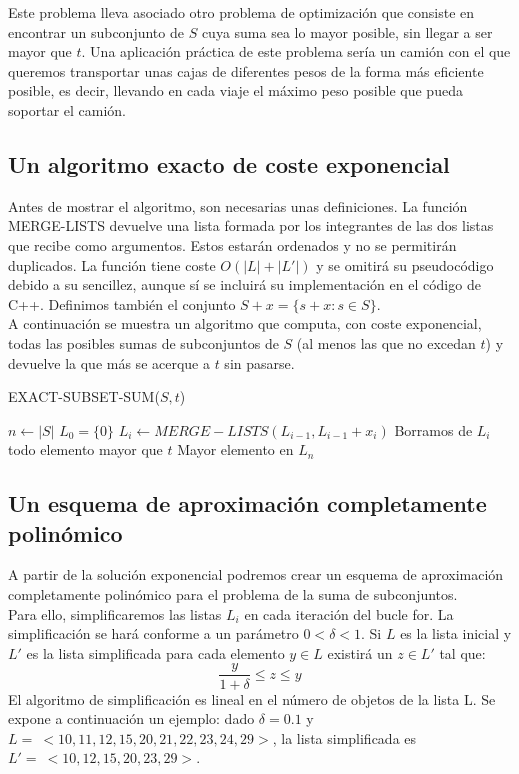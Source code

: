 \documentclass{article}
\begin{document}
Este problema lleva asociado otro problema de optimización que consiste en encontrar un subconjunto de $S$ cuya suma sea lo mayor posible, sin llegar a ser mayor que $t$. Una aplicación práctica de este problema sería un camión con el que queremos transportar unas cajas de diferentes pesos de la forma más eficiente posible, es decir, llevando en cada viaje el máximo peso posible que pueda soportar el camión.

\subsection{Un algoritmo exacto de coste exponencial}
Antes de mostrar el algoritmo, son necesarias unas definiciones. La función MERGE-LISTS devuelve una lista formada por los integrantes de las dos listas que recibe como argumentos. Estos estarán ordenados y no se permitirán duplicados. La función tiene coste $O(|L|+|L'|)$ y se omitirá su pseudocódigo debido a su sencillez, aunque sí se incluirá su implementación en el código de C++. Definimos también el conjunto $S + x = \{ s + x : s \in S\}$.\\

A continuación se muestra un algoritmo que computa, con coste exponencial, todas las posibles sumas de subconjuntos de $S$ (al menos las que no excedan  $t$) y devuelve la que más se acerque a $t$ sin pasarse. \\

\begin{algorithm}[H]
\caption{EXACT-SUBSET-SUM($S,t$)}
\begin{algorithmic}[1]
\STATE $n \gets |S|$
\STATE $L_0 = \{0\} $
\STATE $L_i \gets MERGE-LISTS(L_{i-1}, L_{i-1} + x_i)$
\STATE Borramos de $L_i$ todo elemento mayor que $t$
\ENDFOR
\RETURN Mayor elemento en $L_n$
\end{algorithmic}
\end{algorithm}
  
\subsection{Un esquema de aproximación completamente polinómico}
A partir de la solución exponencial podremos crear un esquema de aproximación completamente polinómico para el problema de la suma de subconjuntos.\\

Para ello, simplificaremos las listas $L_i$ en cada iteración del bucle for. La simplificación se hará conforme a un parámetro $0 < \delta < 1$. Si $L$ es la lista inicial y $L'$ es la lista simplificada para cada elemento $y \in L$ existirá un $z \in L'$ tal que:
\[
\frac{y}{1 + \delta} \leq z \leq y
\]
El algoritmo de simplificación es lineal en el número de objetos de la lista L. Se expone a continuación un ejemplo: dado $\delta = 0.1$ y $L = \ <10, 11, 12 ,15, 20, 21, 22, 23, 24, 29>$, la lista simplificada es $L' = \ <10, 12, 15, 20, 23, 29>$.\\
\end{document}
